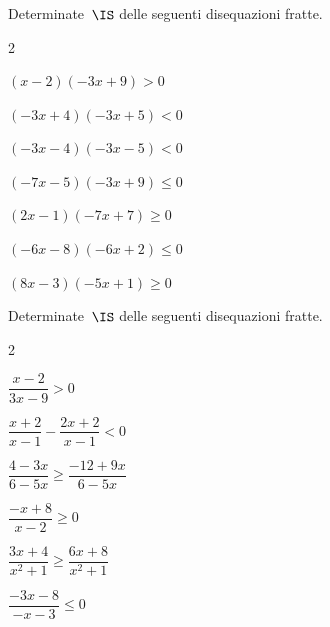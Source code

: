 \subsubsection*{}


\begin{esercizio}[]
\label{ese:dis_}
Determinate~\(\IS\) delle seguenti disequazioni fratte.
\begin{htmulticols}{2}
\begin{enumeratea}
\spazielenx
\item \((x-2)(-3x+9)>0\)
\item \((-3x+4)(-3x+5)<0\)
\item \((-3x-4)(-3x-5)<0\)
\item \((-7x-5)(-3x+9)\le0\)
\item \((2x-1)(-7x+7)\ge0\)
\item \((-6x-8)(-6x+2)\le0\)
\item \((8x-3)(-5x+1)\ge0\)
\end{enumeratea}
\end{htmulticols}
\end{esercizio}

\begin{esercizio}[]
\label{ese:21.55}
Determinate~\(\IS\) delle seguenti disequazioni fratte.
\begin{htmulticols}{2}
\begin{enumeratea}
\spazielenx
\item \(\dfrac{x-2}{3x-9}>0\) 
\item \(\dfrac{x+2}{x-1}-\dfrac{2x+2}{x-1} < 0\) 
\item \(\dfrac{4-3x}{6-5x}\geqslant \dfrac{-12+9x}{6-5x}\) 
\item \(\dfrac{-x+8}{x-2}\geqslant 0\) 
\item \(\dfrac{3x+4}{x^{2}+1}\ge\dfrac{6x+8}{x^{2}+1}\) 
\item \(\dfrac{-3x-8}{-x-3}\leqslant 0\) 
\end{enumeratea}
\end{htmulticols}
\end{esercizio}


